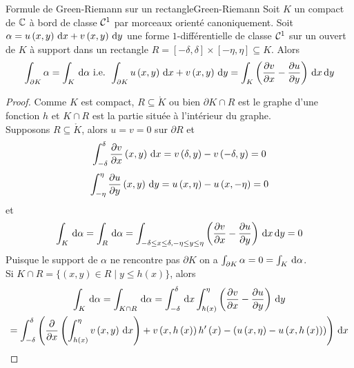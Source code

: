 \documentclass{cours}
\begin{document}
\begin{lemme}{Formule de Green-Riemann sur un rectangle}{Green-Riemann}
    Soit $K$ un compact de $\mathbb{C}$ à bord de classe $\mathcal{C}^{1}$ par morceaux orienté canoniquement. Soit $\alpha = u\left(x, y\right){\rm \, d} x + v\left(x, y\right){\rm \, d} y$ une forme $1$-différentielle de classe $\mathcal{C}^{1}$ sur un ouvert de $K$ à support dans un rectangle $R = \left[- \delta, \delta\right] \times \left[-\eta, \eta\right] \subseteq K$. Alors 
    \begin{equation*}
        \int_{\partial K} \alpha = \int_{K}{\rm \, d} \alpha \text{ i.e. } \int_{\partial K}u\left(x, y\right){\rm \, d} x + v\left(x, y\right) {\rm \, d} y = \int_{K}\left(\frac{\partial v}{\partial x} - \frac{\partial u}{\partial y}\right){\rm \, d} x{\rm \, d} y
    \end{equation*}
\end{lemme}
\begin{proof}
    Comme $K$ est compact, $R\subseteq \mathring{K}$ ou bien $\partial{K \cap R}$ est le graphe d'une fonction $h$ et $K \cap R$ est la partie située à l'intérieur du graphe.\\
    Supposons $R \subseteq \mathring{K}$, alors $u = v = 0$ sur $\partial R$ et 
    \begin{equation*}
        \int_{-\delta}^{\delta}\frac{\partial v}{\partial x}\left(x, y\right){\rm \, d} x = v\left(\delta, y\right) - v\left(-\delta, y\right) = 0
    \end{equation*}
    \begin{equation*}
        \int_{-\eta}^{\eta}\frac{\partial u}{\partial y}\left(x, y\right){\rm \, d} y = u\left(x, \eta\right) - u\left(x, -\eta\right) = 0  
    \end{equation*}
    et 
    \begin{equation*}
        \int_{K}{\rm \, d} \alpha = \int_{R}{\rm \, d} \alpha = \int_{-\delta \leq x \leq \delta, -\eta \leq y \leq \eta} \left(\frac{\partial v}{\partial x} - \frac{\partial u}{\partial y}\right){\rm \, d} x{\rm \, d} y = 0
    \end{equation*}
    Puisque le support de $\alpha$ ne rencontre pas $\partial K$ on a $\int_{\partial K} \alpha = 0 = \int_{K}{\rm \, d} \alpha$. \\
    Si $K \cap R = \{\left(x, y\right) \in R \mid y \leq h\left(x\right)\}$, alors 
    \begin{gather*}
        \int_{K}\d \alpha = \int_{K \cap R}\d \alpha = \int_{- \delta}^{\delta}\d x \int_{h\left(x\right)}^{\eta}\left(\partialderiv{v}{x} - \partialderiv{u}{y}\right)\d y\\
        = \int_{- \delta}^{\delta}\left(\frac{\partial}{\partial x}\left(\int_{h\left(x\right)}^{\eta}v\left(x, y\right)\d x\right)+ v\left(x, h\left(x\right)\right)h'\left(x\right) - \left(u\left(x, \eta\right) - u\left(x, h\left(x\right)\right)\right)\right) \d x\\

\end{gather*}
\end{proof}
\end{document}
